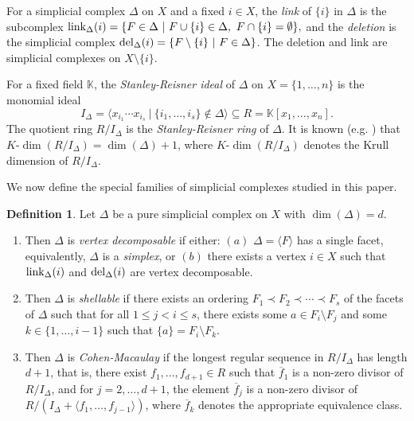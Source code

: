 \documentclass[10pt,a4paper]{amsart}
\theoremstyle{plain}
\theoremstyle{definition}
\newtheorem{definition}[theorem]{Definition}
\theoremstyle{remark}
\numberwithin{equation}{section}
\numberwithin{equation}{section}
\begin{document}
For a simplicial complex $\Delta$ on $X$ and a fixed $i \in X$, the {\it link} of $\{i\}$ in $\Delta$
is the subcomplex
${\rm link}_\Delta(i)   =  \{F \in \Delta ~|~
    F \cup \{i\} \in \Delta,~ F \cap \{i\} = \emptyset\},$
and the {\it deletion} is the simplicial complex
${\rm del}_\Delta(i)  =  \{F \setminus \{i\} ~|~
    F \in \Delta\}$.
    The deletion and link are simplicial complexes
    on $X \setminus \{i\}$.

For a fixed field $\mathbb{K}$, the {\it Stanley-Reisner ideal}
of $\Delta$ on $X = \{1,\ldots,n\}$ is the monomial ideal
$$I_\Delta = \langle x_{i_1}\cdots x_{i_s} ~|~ \{i_1,\ldots,i_s\} \not\in \Delta \rangle \subseteq R= \mathbb{K}[x_1,\ldots,x_n].$$
The quotient ring $R/I_\Delta$ is the {\it Stanley-Reisner ring}
of $\Delta$.
It is known (e.g. \cite[Corollary 6.3.5]{VBook}) that $K$-$\dim(R/I_\Delta) = \dim(\Delta)+1$, 
where $K$-$\dim(R/I_\Delta)$ denotes the Krull dimension 
of $R/I_\Delta$.

We now define the special families of simplicial complexes studied
in this paper.

\begin{definition}  
Let $\Delta$ be a pure simplicial complex on $X$ with
$\dim(\Delta) = d$.
\begin{enumerate}
    \item Then $\Delta$ is {\it vertex decomposable} if either: $(a)$
    $\Delta = \langle F \rangle$ has a single facet, equivalently,
    $\Delta$ is a {\it simplex}, or $(b)$ there exists a vertex $i \in X$
    such that ${\rm link}_\Delta(i)$ and ${\rm del}_\Delta(i)$ are vertex
    decomposable.
    \item Then $\Delta$ is {\it shellable} if there exists an ordering
    $F_1 \prec F_2 \prec \cdots \prec F_s$ of the facets of $\Delta$
    such that for all $1 \leq j < i \leq s$, there exists some $a \in F_i \setminus F_j$ and some $k \in \{1,\ldots,i-1\}$ such that 
    $\{a\} = F_i\setminus F_k$.
    \item Then $\Delta$ is {\it Cohen-Macaulay} if the longest 
    regular sequence in $R/I_\Delta$ has length $d+1$, that is, there
    exist $f_1,\ldots,f_{d+1} \in R$ such that $\overline{f}_1$ is a 
    non-zero divisor
    of $R/I_\Delta$, and for $j=2,\ldots,d+1$, the element 
    $\overline{f}_j$ is a 
    non-zero divisor of $R/(I_\Delta + \langle f_1,\ldots,f_{j-1} \rangle)$,
    where $\overline{f}_k$ denotes the appropriate equivalence class.
\end{enumerate}
\end{definition}
\end{document}

